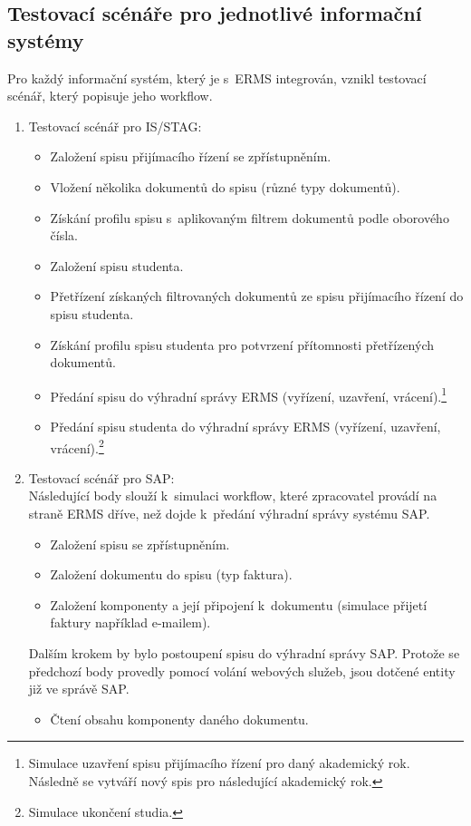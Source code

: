 \documentclass[
  master,
  field=ainfp,
  biblatex,
  language=czech,
  glossaries,
  theorems=false,
  index
]{kidiplom}
\begin{document}
\subsection{Testovací scénáře pro jednotlivé informační systémy}
Pro každý informační systém, který je s~ERMS integrován, vznikl testovací scénář, který popisuje jeho workflow.
\begin{enumerate}
	\item Testovací scénář pro IS/STAG:
	\begin{itemize}
		\item Založení spisu přijímacího řízení se zpřístupněním.
		\item Vložení několika dokumentů do spisu (různé typy dokumentů).
		\item Získání profilu spisu s~aplikovaným filtrem dokumentů podle oborového čísla.
		\item Založení spisu studenta.
		\item Přetřízení získaných filtrovaných dokumentů ze spisu přijímacího řízení do spisu studenta.
		\item Získání profilu spisu studenta pro potvrzení přítomnosti přetřízených dokumentů.
		\item Předání spisu do výhradní správy ERMS (vyřízení, uzavření, vrácení).\footnote{Simulace uzavření spisu přijímacího řízení pro daný akademický rok. Následně se vytváří nový spis pro následující akademický rok.}
		\item Předání spisu studenta  do výhradní správy ERMS (vyřízení, uzavření, vrácení).\footnote{Simulace ukončení studia.}
	\end{itemize}
	\item Testovací scénář pro SAP: \\
	Následující body slouží k~simulaci workflow, které zpracovatel provádí na straně ERMS dříve, než dojde k~předání výhradní správy systému SAP.
	\begin{itemize}
		\item Založení spisu se zpřístupněním.
		\item Založení dokumentu do spisu (typ faktura).
		\item Založení komponenty a její připojení k~dokumentu (simulace přijetí faktury například e-mailem).
	\end{itemize}		
	Dalším krokem by bylo postoupení spisu do výhradní správy SAP. Protože se předchozí body provedly pomocí volání webových služeb, jsou dotčené entity již ve správě SAP.
	\begin{itemize}
		\item Čtení obsahu komponenty daného dokumentu.

\end{itemize}
\end{enumerate}
\end{document}
